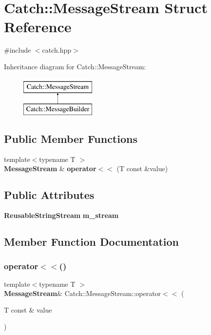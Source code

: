 \section{Catch\+::Message\+Stream Struct Reference}
\label{struct_catch_1_1_message_stream}


{\ttfamily \#include $<$catch.\+hpp$>$}

Inheritance diagram for Catch\+::Message\+Stream\+:\begin{figure}[H]
\begin{center}
\leavevmode
\includegraphics[height=2.000000cm]{struct_catch_1_1_message_stream}
\end{center}
\end{figure}
\subsection*{Public Member Functions}
\begin{DoxyCompactItemize}
\item 
{\footnotesize template$<$typename T $>$ }\\\textbf{ Message\+Stream} \& \textbf{ operator$<$$<$} (T const \&value)
\end{DoxyCompactItemize}
\subsection*{Public Attributes}
\begin{DoxyCompactItemize}
\item 
\textbf{ Reusable\+String\+Stream} \textbf{ m\+\_\+stream}
\end{DoxyCompactItemize}


\subsection{Member Function Documentation}
\mbox{\label{struct_catch_1_1_message_stream_a554c4aff5925a077e9fe9d858217428d}} 
\subsubsection{operator$<$$<$()}
{\footnotesize\ttfamily template$<$typename T $>$ \\
\textbf{ Message\+Stream}\& Catch\+::\+Message\+Stream\+::operator$<$$<$ (\begin{DoxyParamCaption}\item[{T const \&}]{value }\end{DoxyParamCaption})\hspace{0.3cm}{\ttfamily [inline]}}



